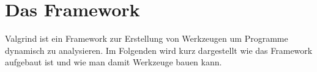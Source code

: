 \section{Das Framework}
Valgrind ist ein Framework zur Erstellung von Werkzeugen um Programme dynamisch zu analysieren. Im Folgenden wird kurz dargestellt wie das Framework aufgebaut ist und wie man damit Werkzeuge bauen kann.